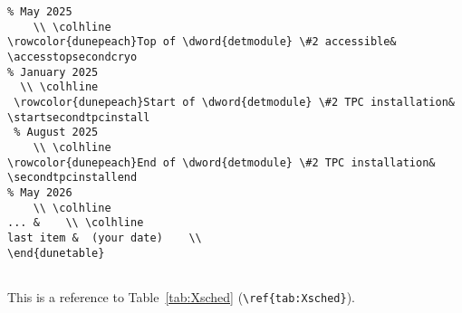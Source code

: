 \begin{verbatim}
% May 2025 
    \\ \colhline
\rowcolor{dunepeach}Top of \dword{detmodule} \#2 accessible& \accesstopsecondcryo   
% January 2025
  \\ \colhline
 \rowcolor{dunepeach}Start of \dword{detmodule} \#2 TPC installation& \startsecondtpcinstall  
 % August 2025 
    \\ \colhline
\rowcolor{dunepeach}End of \dword{detmodule} \#2 TPC installation& \secondtpcinstallend  
% May 2026 
    \\ \colhline
... &    \\ \colhline
last item &  (your date)    \\
\end{dunetable}


\end{verbatim}

This is a reference to Table~\ref{tab:Xsched} (\verb|\ref{tab:Xsched}|).

